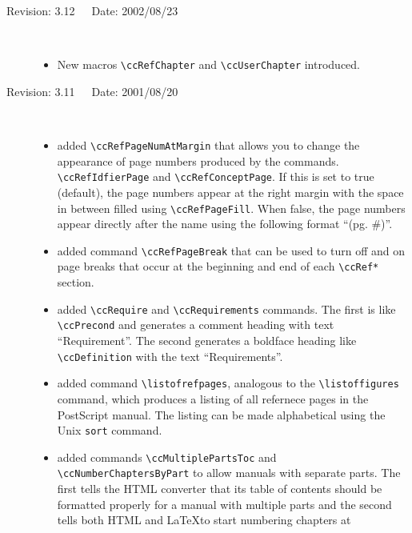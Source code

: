 \documentclass[11pt]{article}
\begin{document}
\begin{description}
    \item[Revision: 3.12~~~Date: 2002/08/23]~\\[-3mm]
    \begin{itemize}
       \item New macros \verb|\ccRefChapter| and \verb|\ccUserChapter| introduced.
          \end{itemize}
    \item[Revision: 3.11~~~Date: 2001/08/20]~\\[-3mm]
    \begin{itemize}
       \item added \verb|\ccRefPageNumAtMargin| that allows you to change the
             appearance of page numbers produced by the commands.
             \verb|\ccRefIdfierPage| and \verb|\ccRefConceptPage|.
             If this is set to true (default), the page numbers appear at the
             right margin with the space in between filled using
             \verb+\ccRefPageFill+.  When false, the page numbers appear
             directly after the name using the following format ``(pg. \#)''.
       \item added command \verb|\ccRefPageBreak| that can be used to turn off
             and on page breaks that occur at the beginning and end of each
             \verb|\ccRef*| section.
       \item added \verb|\ccRequire| and \verb|\ccRequirements| commands.
             The first is like \verb|\ccPrecond| and generates a comment
             heading with text ``Requirement''. The second generates a
             boldface heading like \verb|\ccDefinition| with the text
             ``Requirements''.
       \item added command \verb|\listofrefpages|, analogous to the
             \verb|\listoffigures| command, which produces a listing of
             all refernece pages in the PostScript manual.  The listing
             can be made alphabetical using the Unix \verb|sort| command.
       \item added commands \verb|\ccMultiplePartsToc| and
             \verb|\ccNumberChaptersByPart|
             to allow manuals with separate parts.  The first tells the
             HTML converter that its table of contents should be formatted
             properly for a manual with multiple parts and the second
             tells both HTML and \LaTeX to start numbering chapters at

\end{itemize}
\end{description}
\end{document}
